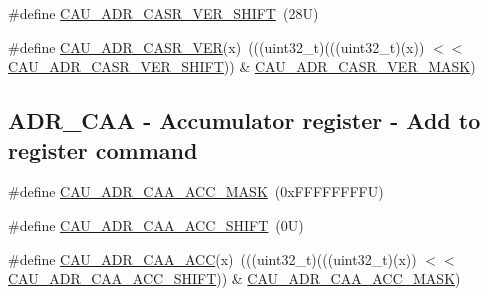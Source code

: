\begin{DoxyCompactItemize}
\#define \mbox{\hyperlink{group___c_a_u___register___masks_ga22dcce65fce4ef3511615cbd4d1a0e1e}{C\+A\+U\+\_\+\+A\+D\+R\+\_\+\+C\+A\+S\+R\+\_\+\+V\+E\+R\+\_\+\+S\+H\+I\+FT}}~(28\+U)
\item 
\#define \mbox{\hyperlink{group___c_a_u___register___masks_gaa5ee00ac2f0ef91869f7f0ec921441f6}{C\+A\+U\+\_\+\+A\+D\+R\+\_\+\+C\+A\+S\+R\+\_\+\+V\+ER}}(x)~(((uint32\+\_\+t)(((uint32\+\_\+t)(x)) $<$$<$ \mbox{\hyperlink{group___c_a_u___register___masks_ga22dcce65fce4ef3511615cbd4d1a0e1e}{C\+A\+U\+\_\+\+A\+D\+R\+\_\+\+C\+A\+S\+R\+\_\+\+V\+E\+R\+\_\+\+S\+H\+I\+FT}})) \& \mbox{\hyperlink{group___c_a_u___register___masks_gabb62168b08dff77e1dd30ca4cb6cd997}{C\+A\+U\+\_\+\+A\+D\+R\+\_\+\+C\+A\+S\+R\+\_\+\+V\+E\+R\+\_\+\+M\+A\+SK}})
\end{DoxyCompactItemize}
\subsection*{A\+D\+R\+\_\+\+C\+AA -\/ Accumulator register -\/ Add to register command}
\begin{DoxyCompactItemize}
\item 
\#define \mbox{\hyperlink{group___c_a_u___register___masks_gacc0c6924fefc7cc98506f9c0d031d9b4}{C\+A\+U\+\_\+\+A\+D\+R\+\_\+\+C\+A\+A\+\_\+\+A\+C\+C\+\_\+\+M\+A\+SK}}~(0x\+F\+F\+F\+F\+F\+F\+F\+F\+U)
\item 
\#define \mbox{\hyperlink{group___c_a_u___register___masks_gaf629b44286a47b9d05d74250f509747a}{C\+A\+U\+\_\+\+A\+D\+R\+\_\+\+C\+A\+A\+\_\+\+A\+C\+C\+\_\+\+S\+H\+I\+FT}}~(0\+U)
\item 
\#define \mbox{\hyperlink{group___c_a_u___register___masks_ga7070ca5dd02de1404c00f544caeb11c6}{C\+A\+U\+\_\+\+A\+D\+R\+\_\+\+C\+A\+A\+\_\+\+A\+CC}}(x)~(((uint32\+\_\+t)(((uint32\+\_\+t)(x)) $<$$<$ \mbox{\hyperlink{group___c_a_u___register___masks_gaf629b44286a47b9d05d74250f509747a}{C\+A\+U\+\_\+\+A\+D\+R\+\_\+\+C\+A\+A\+\_\+\+A\+C\+C\+\_\+\+S\+H\+I\+FT}})) \& \mbox{\hyperlink{group___c_a_u___register___masks_gacc0c6924fefc7cc98506f9c0d031d9b4}{C\+A\+U\+\_\+\+A\+D\+R\+\_\+\+C\+A\+A\+\_\+\+A\+C\+C\+\_\+\+M\+A\+SK}})
\end{DoxyCompactItemize}
